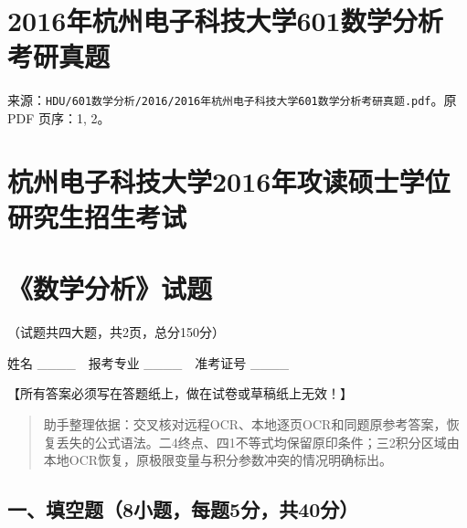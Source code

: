 \documentclass[11pt,fontset=fandol]{ctexart}
\begin{document}
\section{2016年杭州电子科技大学601数学分析考研真题}\label{ux5e74ux676dux5ddeux7535ux5b50ux79d1ux6280ux5927ux5b66601ux6570ux5b66ux5206ux6790ux8003ux7814ux771fux9898}

来源：\texttt{HDU/601数学分析/2016/2016年杭州电子科技大学601数学分析考研真题.pdf}。原
PDF 页序：1, 2。

\section{杭州电子科技大学2016年攻读硕士学位研究生招生考试}\label{ux676dux5ddeux7535ux5b50ux79d1ux6280ux5927ux5b662016ux5e74ux653bux8bfbux7855ux58ebux5b66ux4f4dux7814ux7a76ux751fux62dbux751fux8003ux8bd5}

\section{《数学分析》试题}\label{ux6570ux5b66ux5206ux6790ux8bd5ux9898}

（试题共四大题，共2页，总分150分）

姓名 \_\_\_\_　报考专业 \_\_\_\_　准考证号 \_\_\_\_

【所有答案必须写在答题纸上，做在试卷或草稿纸上无效！】

\begin{quote}
助手整理依据：交叉核对远程OCR、本地逐页OCR和同题原参考答案，恢复丢失的公式语法。二4终点、四1不等式均保留原印条件；三2积分区域由本地OCR恢复，原极限变量与积分参数冲突的情况明确标出。
\end{quote}

\subsection{一、填空题（8小题，每题5分，共40分）}\label{ux4e00ux586bux7a7aux98988ux5c0fux9898ux6bcfux98985ux5206ux517140ux5206}
\end{document}
